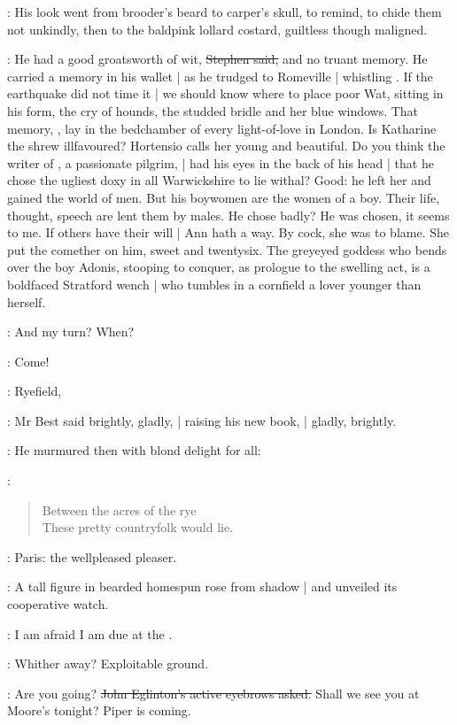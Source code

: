 :
His look went from brooder's beard to carper's skull,
to remind,
to chide them not unkindly,
then to the baldpink lollard costard,
guiltless though maligned.

\Stephen:
He had a good groatsworth of wit,
\sout{Stephen said,}
and no truant memory.
He carried a memory in his wallet |
as he trudged to Romeville |
whistling .
If the earthquake did not time it |
we should know where to place poor Wat,
sitting in his form,
the cry of hounds,
the studded bridle and her blue windows.
That memory,
,
lay in the bedchamber of every light-of-love in London.
Is Katharine the shrew illfavoured?
Hortensio calls her young and beautiful.
Do you think the writer of ,
a passionate pilgrim, |
had his eyes in the back of his head |
that he chose the ugliest doxy in all Warwickshire to lie withal?
Good:
he left her and gained the world of men.
But his boywomen are the women of a boy.
Their life, thought, speech are lent them by males.
He chose badly?
He was chosen, it seems to me.
If others have their will |
Ann hath a way.
By cock, she was to blame.
She put the comether on him,
sweet and twentysix.
The greyeyed goddess who bends over the boy Adonis,
stooping to conquer,
as prologue to the swelling act,
is a boldfaced Stratford wench |
who tumbles in a cornfield
a lover younger than herself.

\StephenInt:
And my turn?
When?

\StephenInt:
Come!

\best:
Ryefield,

:
Mr Best said brightly, gladly, |
raising his new book, |
gladly, brightly.

:
He murmured then with blond delight for all:

\best:
\begin{verse}
    Between the acres of the rye \\
    These pretty countryfolk would lie.
\end{verse}

\StephenInt:
Paris:
the wellpleased pleaser.

:
A tall figure in bearded homespun rose from shadow |
and unveiled its cooperative watch.%

\AErussell:
I am afraid I am due at the .

\StephenInt:
Whither away?
Exploitable ground.

\eglinton:
Are you going?
\sout{John Eglinton's active eyebrows asked.}
Shall we see you at Moore's tonight?
Piper is coming.

